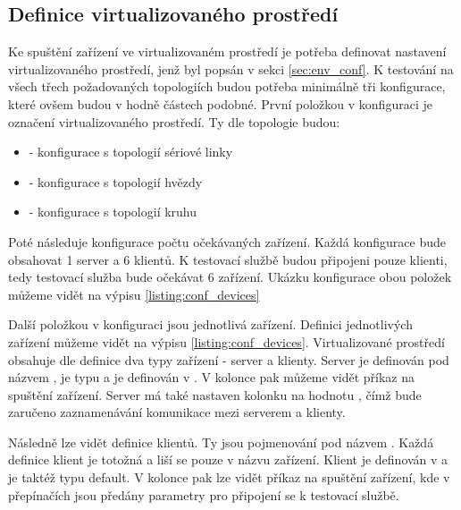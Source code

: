 \subsection{Definice virtualizovaného prostředí}

Ke spuštění zařízení ve virtualizovaném prostředí je potřeba definovat nastavení virtualizovaného prostředí, jenž byl popsán v sekci \ref{sec:env_conf}. K testování na všech třech požadovaných topologiích budou potřeba minimálně tři konfigurace, které ovšem budou v hodně částech podobné. První položkou v konfiguraci je označení virtualizovaného prostředí. Ty dle topologie budou:

\begin{itemize}
    \item {} - konfigurace s topologií sériové linky
    \item {} - konfigurace s topologií hvězdy
    \item {} - konfigurace s topologií kruhu
\end{itemize}

Poté následuje konfigurace počtu očekávaných zařízení. Každá konfigurace bude obsahovat 1 server a 6 klientů. K testovací službě budou připojeni pouze klienti, tedy testovací služba bude očekávat 6 zařízení. Ukázku konfigurace obou položek můžeme vidět na výpisu \ref{listing:conf_devices}

Další položkou v konfiguraci jsou jednotlivá zařízení. Definici jednotlivých zařízení můžeme vidět na výpisu \ref{listing:conf_devices}. Virtualizované prostředí obsahuje dle definice dva typy zařízení - server a klienty. Server je definován pod názvem , je typu  a je definován v . V kolonce  pak můžeme vidět příkaz na spuštění zařízení. Server má také nastaven kolonku  na hodnotu , čímž bude zaručeno zaznamenávání komunikace mezi serverem a klienty.

Následně lze vidět definice klientů. Ty jsou pojmenování pod názvem . Každá definice klient je totožná a liší se pouze v názvu zařízení. Klient je definován v  a je taktéž typu default. V kolonce  pak lze vidět příkaz na spuštění zařízení, kde v přepínačích jsou předány parametry pro připojení se k testovací službě.


